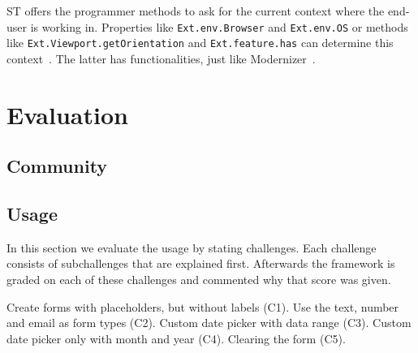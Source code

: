 \documentclass[a4paper]{artikel3}
\newcommand{\code}[1]{\texttt{#1}}
\renewcommand{\paragraph}[1]{\vspace{2mm} \noindent {\bf #1}  }
\newcommand{\challenge}[1]{\paragraph{#1}}
\begin{document}
ST offers the programmer methods to ask for the current context where the end-user is working in.  Properties like \code{Ext.env.Browser} and \code{Ext.env.OS} or methods like \code{Ext.Viewport.getOrientation} and \code{Ext.feature.has} can determine this context~\cite{JohnEClark2012}.  The latter has functionalities,  just like Modernizer~\cite{Modernizr2012}.  


\section{Evaluation}

\subsection{Community} %
\label{sec:community}



\subsection{Usage}
\label{sec:poc}
In this section we evaluate the usage by stating challenges.
Each challenge consists of subchallenges that are explained first.
Afterwards the framework is graded on each of these challenges and commented why that score was given.

\challenge{Forms (C1,C2,C3,C4,C5)}
Create forms with placeholders, but without labels (C1).
Use the text, number and email as form types (C2).
Custom date picker with data range (C3).
Custom date picker only with month and year (C4).
Clearing the form (C5).
\end{document}
